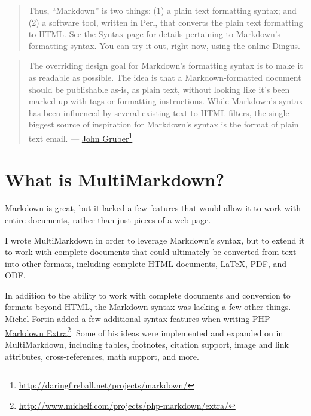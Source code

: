\begin{quote}
Thus, ``Markdown'' is two things: (1) a plain text formatting
syntax; and (2) a software tool, written in Perl, that converts
the plain text formatting to HTML. See the Syntax page for details
pertaining to Markdown's formatting syntax. You can try it out,
right now, using the online Dingus.
\end{quote}

\begin{quote}
The overriding design goal for Markdown's formatting syntax is to
make it as readable as possible. The idea is that a Markdown-formatted
document should be publishable as-is, as plain text, without looking
like it's been marked up with tags or formatting instructions. While
Markdown's syntax has been influenced by several existing
text-to-HTML filters, the single biggest source of inspiration for
Markdown's syntax is the format of plain text email. --- \href{http://daringfireball.net/projects/markdown/}{John Gruber}\footnote{\href{http://daringfireball.net/projects/markdown/}{http:\slash \slash daringfireball.net\slash projects\slash markdown\slash }}
\end{quote}

\section{What is MultiMarkdown? }
\label{whatismultimarkdown}

Markdown is great, but it lacked a few features that would allow it to work with entire documents, rather than just pieces of a web page.

I wrote MultiMarkdown in order to leverage Markdown's syntax, but to extend it to work with complete documents that could ultimately be converted from text into other formats, including complete HTML documents, LaTeX, PDF, and ODF.

In addition to the ability to work with complete documents and conversion to formats beyond HTML, the Markdown syntax was lacking a few other things. Michel Fortin added a few additional syntax features when writing \href{http://www.michelf.com/projects/php-markdown/extra/}{PHP Markdown Extra}\footnote{\href{http://www.michelf.com/projects/php-markdown/extra/}{http:\slash \slash www.michelf.com\slash projects\slash php-markdown\slash extra\slash }}. Some of his ideas were implemented and expanded on in MultiMarkdown, including tables, footnotes, citation support, image and link attributes, cross-references, math support, and more.

